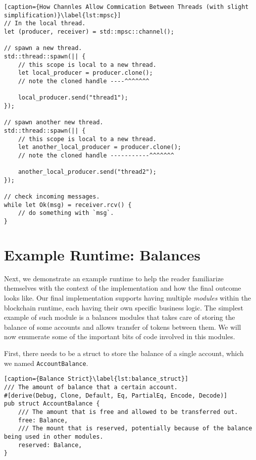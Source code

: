 \begin{lstlisting}[caption={How Channles Allow Commication Between Threads (with slight simplification)}\label{lst:mpsc}]
// In the local thread.
let (producer, receiver) = std::mpsc::channel();

// spawn a new thread.
std::thread::spawn(|| {
	// this scope is local to a new thread.
	let local_producer = producer.clone();
	// note the cloned handle ----^^^^^^^

	local_producer.send("thread1");
});

// spawn another new thread.
std::thread::spawn(|| {
	// this scope is local to a new thread.
	let another_local_producer = producer.clone();
	// note the cloned handle -----------^^^^^^^

	another_local_producer.send("thread2");
});

// check incoming messages.
while let Ok(msg) = receiver.rcv() {
	// do something with `msg`.
}
\end{lstlisting}


\section{Example Runtime: Balances}

Next, we demonstrate an example runtime to help the reader familiarize themselves with the context
of the implementation and how the final outcome looks like. Our final implementation supports having
multiple \textit{modules} within the blockchain runtime, each having their own specific business
logic. The simplest example of such module is a balances modules that takes care of storing the
balance of some accounts and allows transfer of tokens between them. We will now enumerate some of
the important bits of code involved in this modules.

First, there needs to be a struct to store the balance of a single account, which we named
\texttt{AccountBalance}.

\begin{lstlisting}[caption={Balance Strict}\label{lst:balance_struct}]
/// The amount of balance that a certain account.
#[derive(Debug, Clone, Default, Eq, PartialEq, Encode, Decode)]
pub struct AccountBalance {
	/// The amount that is free and allowed to be transferred out.
	free: Balance,
	/// The mount that is reserved, potentially because of the balance being used in other modules.
	reserved: Balance,
}
\end{lstlisting}

